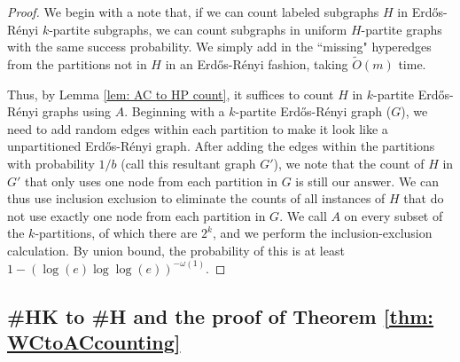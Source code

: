 \documentclass[11pt,letterpaper,pdftex]{article}
\def\Otil{\tilde{O}}
\begin{document}
\begin{proof}
We begin with a note that, if we can count labeled subgraphs $H$ in Erd{\H{o}}s-R{\'{e}}nyi $k$-partite subgraphs, we can count subgraphs in uniform $H$-partite graphs with the same success probability. We simply add in the ``missing" hyperedges from the partitions not in $H$ in an Erd{\H{o}}s-R{\'{e}}nyi fashion, taking $\Otil(m)$ time.


Thus, by Lemma \ref{lem: AC to HP count}, it suffices to count $H$ in $k$-partite Erd{\H{o}}s-R{\'{e}}nyi graphs using $A$. Beginning with a $k$-partite Erd{\H{o}}s-R{\'{e}}nyi graph ($G$), we need to add random edges within each partition to make it look like a unpartitioned Erd{\H{o}}s-R{\'{e}}nyi graph. After adding the edges within the partitions with probability $1/b$ (call this resultant graph $G'$), we note that the count of $H$ in $G'$ that only uses one node from each partition in $G$ is still our answer. We can thus use inclusion exclusion to eliminate the counts of all instances of $H$ that do not use exactly one node from each partition in $G$. We call $A$ on every subset of the $k$-partitions, of which there are $2^k$, and we perform the inclusion-exclusion calculation. By union bound, the probability of this is at least $1-\left(\log (e) \log\log (e)\right)^{-\omega(1)} $.

\end{proof}

\subsection{\#HK to \#H and the proof of Theorem \ref{thm: WCtoACcounting}}
\end{document}
